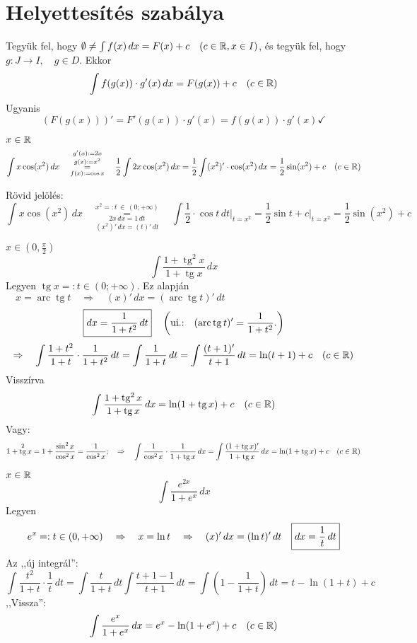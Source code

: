 \documentclass[a4paper,11.5pt]{article}
\DeclareMathOperator{\tg}{tg}
\DeclareMathOperator{\arc}{arc}
\begin{document}
	\section{Helyettesítés szabálya}
	\begin{revision}
		Tegyük fel, hogy $\emptyset\not=\int f(x)\,dx=F(x)+c\quad (c\in\mathbb{R}, x\in I)$, és tegyük fel, hogy\\ $g:J\to I, \quad g\in D.$ Ekkor
		\[ \int f(g(x))\cdot g'(x)\,dx=F(g(x))+c\quad (c\in\mathbb{R}) \]
		Ugyanis
		\[ (F(g(x)))'=F'(g(x))\cdot g'(x)=f(g(x))\cdot g'(x)\checkmark \]
	\end{revision}
	\begin{task}$x\in\mathbb{R}$
		\[ \int x\cos(x^2)\,dx\quad \overset{g'(x):=2x}{\overset{g(x):=x^2}{\underset{f(x):=\cos x}{=}}}\quad \frac{1}{2}\int 2x\cos(x^2)\,dx=\frac{1}{2}\int(x^2)'\cdot\cos(x^2)\,dx=\frac{1}{2}\sin(x^2)+c\quad (c\in\mathbb{R}) \]
	\end{task}
	\begin{note}
		Rövid jelölés: 
		\[ \int x\cos(x^2)\,dx\quad \overset{x^2=:t\,\in\,(0;+\infty)}{\underset{(x^2)'\,dx=(t)'\,dt}{\underset{2x\,dx=1\,dt}{=}}}\quad\int\frac{1}{2}\cdot\cos t\,dt\big|_{t=x^2}=\frac{1}{2}\sin t +c\big|_{t=x^2}=\frac{1}{2}\sin(x^2)+c  \]
	\end{note}
	\begin{task}$x\in(0,\frac{\pi}{2})$
		\[ \int\frac{1+\tg^2x}{1+\tg x}\,dx \]
		Legyen  \quad $\tg x=:t\in(0;+\infty).$ \quad Ez alapján $\quad  x=\arc\tg t\quad \Rightarrow\quad (x)'\,dx=(\arc\tg t)'\,dt$
		\[ \text{\fbox{$\displaystyle dx=\frac{1}{1+t^2}\,dt$}} \quad \left(\text{ui.:\quad }(\arc\tg t)'=\frac{1}{1+t^2}.\right)\]
		\[ \Rightarrow\quad \int\frac{1+t^2}{1+t}\cdot\frac{1}{1+t^2}\,dt=\int\frac{1}{1+t}\,dt=\int\frac{(t+1)'}{t+1}\,dt=\ln(t+1)+c\quad (c\in\mathbb{R}) \]
		Visszírva
		\[ \int\frac{1+\tg^2 x}{1+\tg x}\,dx=\ln(1+\tg x)+c\quad (c\in\R) \]
		Vagy:
		\[ 1+\tg^2 x=1+\frac{\sin^2x}{\cos^2x}=\frac{1}{\cos^2x};\quad \Rightarrow\quad \int\frac{1}{\cos^2x}\cdot\frac{1}{1+\tg x}\,dx=\int\frac{(1+\tg x)'}{1+\tg x}\,dx=\ln(1+\tg x)+c\quad (c\in\R) \]
	\end{task}
	\begin{task}$x\in\mathbb{R}$
		\[ \int\frac{e^{2x}}{1+e^x}\,dx \]
		Legyen \[e^x=:t\in(0,+\infty)\quad \Rightarrow\quad x=\ln t\quad \Rightarrow\quad (x)'\,dx=(\ln t)'\,dt\quad \text{\fbox{$\displaystyle dx=\frac{1}{t}\,dt$}} \]
		Az ,,új integrál'':\quad \[\displaystyle \int\frac{t^2}{1+t}\cdot\frac{1}{t}\,dt=\int\frac{t}{1+t}\,dt\int\frac{t+1-1}{t+1}\,dt=\int\left(1-\frac{1}{1+t}\right)\,dt=t-\ln(1+t)+c \]
		,,Vissza'':
		\[ \int\frac{e^x}{1+e^x}\,dx=e^x-\ln(1+e^x)+c\quad (c\in\mathbb{R}) \]
	\end{task}
\end{document}
